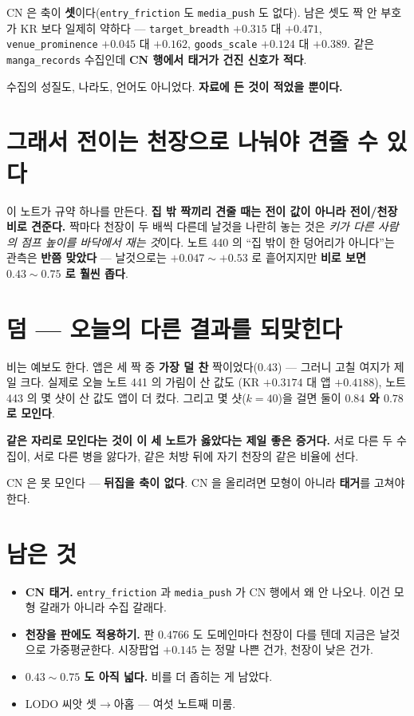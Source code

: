 \documentclass[11pt]{article}
\begin{document}
CN 은 축이 \textbf{셋}이다(\texttt{entry\_friction} 도 \texttt{media\_push}
도 없다). 남은 셋도 짝 안 부호가 KR 보다 일제히 약하다 ---
\texttt{target\_breadth} $+0.315$ 대 $+0.471$, \texttt{venue\_prominence}
$+0.045$ 대 $+0.162$, \texttt{goods\_scale} $+0.124$ 대 $+0.389$. 같은
\texttt{manga\_records} 수집인데 \textbf{CN 행에서 태거가 건진 신호가 적다}.

수집의 성질도, 나라도, 언어도 아니었다. \textbf{자료에 든 것이 적었을
뿐이다.}

\section{그래서 전이는 천장으로 나눠야 견줄 수 있다}

이 노트가 규약 하나를 만든다. \textbf{집 밖 짝끼리 견줄 때는 전이 값이
아니라 전이/천장 비로 견준다.} 짝마다 천장이 두 배씩 다른데 날것을 나란히
놓는 것은 \emph{키가 다른 사람의 점프 높이를 바닥에서 재는 것}이다.
노트 440 의 ``집 밖이 한 덩어리가 아니다''는 관측은 \textbf{반쯤 맞았다}
--- 날것으로는 $+0.047 \sim +0.53$ 로 흩어지지만 \textbf{비로 보면
$0.43 \sim 0.75$ 로 훨씬 좁다}.

\section{덤 --- 오늘의 다른 결과를 되맞힌다}

비는 예보도 한다. 앱은 세 짝 중 \textbf{가장 덜 찬} 짝이었다($0.43$) ---
그러니 고칠 여지가 제일 크다. 실제로 오늘 노트 441 의 가림이 산 값도
(KR $+0.3174$ 대 앱 $+0.4188$), 노트 443 의 몇 샷이 산 값도 앱이 더
컸다. 그리고 몇 샷($k{=}40$)을 걸면 둘이 \textbf{$0.84$ 와 $0.78$ 로
모인다}.

\textbf{같은 자리로 모인다는 것이 이 세 노트가 옳았다는 제일 좋은 증거다.}
서로 다른 두 수집이, 서로 다른 병을 앓다가, 같은 처방 뒤에 자기 천장의
같은 비율에 선다.

CN 은 못 모인다 --- \textbf{뒤집을 축이 없다}. CN 을 올리려면 모형이
아니라 \textbf{태거}를 고쳐야 한다.

\section*{남은 것}

\begin{itemize}
\item \textbf{CN 태거.} \texttt{entry\_friction} 과 \texttt{media\_push} 가
CN 행에서 왜 안 나오나. 이건 모형 갈래가 아니라 수집 갈래다.
\item \textbf{천장을 판에도 적용하기.} 판 $0.4766$ 도 도메인마다 천장이
다를 텐데 지금은 날것으로 가중평균한다. 시장팝업 $+0.145$ 는 정말 나쁜
건가, 천장이 낮은 건가.
\item \textbf{$0.43 \sim 0.75$ 도 아직 넓다.} 비를 더 좁히는 게 남았다.
\item LODO 씨앗 셋$\to$아홉 --- 여섯 노트째 미룸.
\end{itemize}
\end{document}
